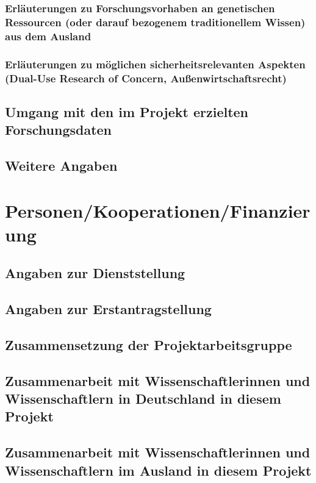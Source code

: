 \documentclass{scrartcl}
\begin{document}
\subsubsection{Erläuterungen zu Forschungsvorhaben an genetischen Ressourcen (oder darauf bezogenem traditionellem Wissen) aus dem Ausland}

\subsubsection{Erläuterungen zu möglichen sicherheitsrelevanten Aspekten (\glqq{}Dual-Use Research of Concern\grqq{}, Außenwirtschaftsrecht)}

\subsection{Umgang mit den im Projekt erzielten Forschungsdaten}

\subsection{Weitere Angaben}


\section{Personen/Kooperationen/Finanzierung}

\subsection{Angaben zur Dienststellung}

\subsection{Angaben zur Erstantragstellung}

\subsection{Zusammensetzung der Projektarbeitsgruppe}

\subsection{Zusammenarbeit mit Wissenschaftlerinnen und Wissenschaftlern in Deutschland in diesem Projekt}

\subsection{Zusammenarbeit mit Wissenschaftlerinnen und Wissenschaftlern im Ausland in diesem Projekt}
\end{document}
